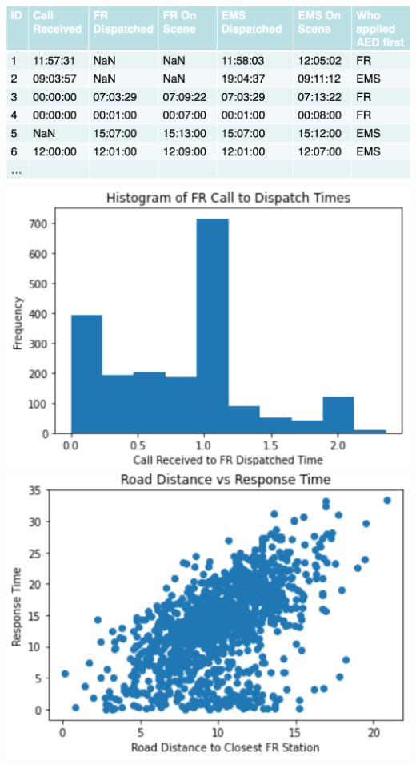 \documentclass[11pt]{article}
\theoremstyle{definition}
\begin{document}
\includegraphics[width=\textwidth/2-2.08049pt]{34.png}
\includegraphics[width=\textwidth/2]{35.png}
\includegraphics[width=\textwidth/2]{36.png}
\end{document}
